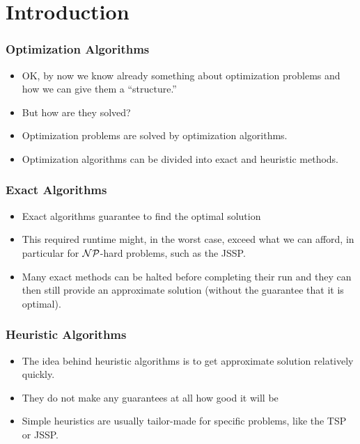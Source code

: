 \documentclass[mathserif]{beamer}%
\subtitle{3. Metaheuristics}%
\begin{document}
%
%
\startPresentation%
%
%
\section{Introduction}%
%
\begin{frame}%
\frametitle{Optimization Algorithms}%
\begin{itemize}%
\item OK, by now we know already something about optimization problems and how we can give them a ``structure.''%
\item<2-> But how are they solved?%
\item<3-> Optimization problems are solved by \alert{optimization algorithms}.%
\item<4-> Optimization algorithms can be divided into \alert{exact} and \alert{heuristic} methods.%
\end{itemize}%
\end{frame}%
%
\begin{frame}[t]%
\frametitle{Exact Algorithms}%
\begin{itemize}%
\item \alert{Exact} algorithms guarantee to find the optimal solution%
\item<3-> This required runtime might, in the worst case, exceed what we can afford, in particular for \mbox{$\mathcal{NP}$-hard} problems, such as the JSSP.%
\item<4-> Many exact methods can be halted before completing their run and they can then still provide an approximate solution (without the guarantee that it is optimal).%
\end{itemize}%
\end{frame}%
%
\begin{frame}[t]%
\frametitle{Heuristic Algorithms}%
\begin{itemize}%
\item The idea behind heuristic algorithms is to get approximate solution relatively quickly.%
\item<2-> They do not make any guarantees at all how good it will be%
\item<5-> Simple heuristics are usually tailor-made for specific problems, like the TSP or JSSP.%
\end{itemize}%
\end{frame}%
\end{document}
